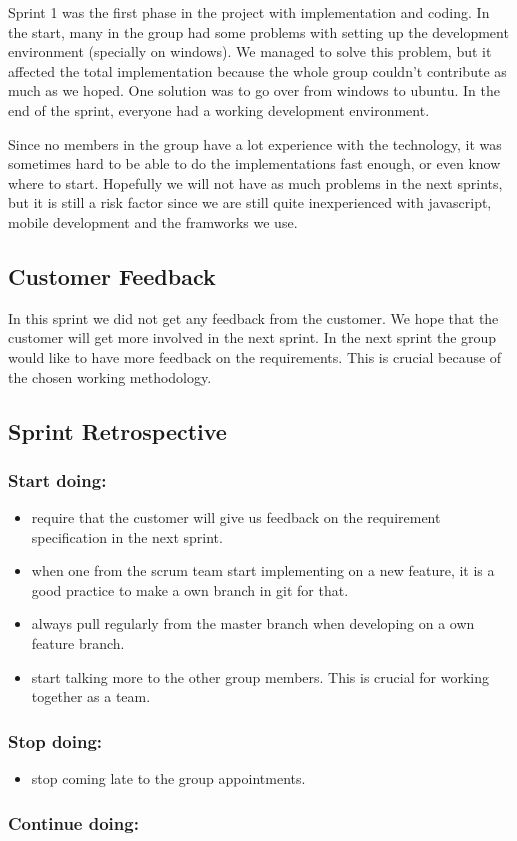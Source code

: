 	Sprint 1 was the first phase in the project with implementation and coding. In the start, 
	many in the group had
	some problems with setting up the development environment (specially on windows). We managed
	to solve this problem, but it affected the total implementation because the whole group couldn't 
	contribute as much as we hoped. One solution was to go over from windows to ubuntu. 
	In the end of the sprint, everyone had a working development environment.

	Since no members in the group have a lot experience with the technology, it was sometimes hard
	to be able to do the implementations fast enough, or even know where to start. 
	Hopefully we will not have as much problems in the next sprints, but it is still a risk factor 
	since we are still quite inexperienced with javascript, mobile development and the framworks we use. 

\subsection{Customer Feedback}
	In this sprint we did not get any feedback from the customer. We hope that the customer
	will get more involved in the next sprint. In the next sprint the group would like to have
	more feedback on the requirements. This is crucial because of the chosen working 
	methodology.

\subsection{Sprint Retrospective}
	\subsubsection*{Start doing: } 
		\begin{itemize}
			\item require that the customer will give us feedback on the
			requirement specification in the next sprint.
			\item when one from the scrum team start implementing on a new feature, 
			it is a good practice to make a own branch in git for that. 
			\item always pull regularly from the master branch when developing
			on a own feature branch.
			\item start talking more to the other group members. This is crucial 
			for working together as a team.
		\end{itemize}
	\subsubsection*{Stop doing: } 
		\begin{itemize}
			\item stop coming late to the group appointments.
		\end{itemize}
	\subsubsection*{Continue doing: } 
